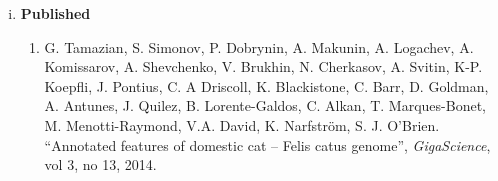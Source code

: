 
% 
 
\begin{enumerate}[i)]
\item  {\bf Published} %

\begin{enumerate}
\item  G. Tamazian, S. Simonov, P. Dobrynin, A. Makunin, A. Logachev, A. Komissarov, A. Shevchenko, V. Brukhin, N. Cherkasov, A. Svitin, K-P. Koepfli, J. Pontius, C. A Driscoll, K. Blackistone, C. Barr, D. Goldman, A. Antunes, J. Quilez, B. Lorente-Galdos, C. Alkan, T. Marques-Bonet, M. Menotti-Raymond, V.A. David, K. Narfström, S. J. O'Brien. ``Annotated features of domestic cat – Felis catus genome'', {\em GigaScience}, vol 3, no 13, 2014.
\end{enumerate}

\end{enumerate}

